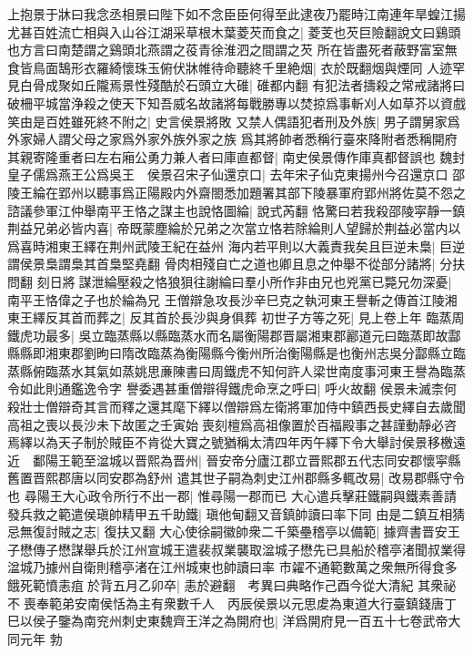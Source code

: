 上抱景于牀曰我念丞相景曰陛下如不念臣臣何得至此逮夜乃罷時江南連年旱蝗江揚尤甚百姓流亡相與入山谷江湖采草根木葉菱芡而食之|{
	菱芰也芡巨險翻說文曰鷄頭也方言曰南楚謂之鷄頭北燕謂之䓈青徐淮泗之間謂之芡}
所在皆盡死者蔽野富室無食皆鳥面鵠形衣羅綺懷珠玉俯伏牀帷待命聽終千里絶烟|{
	衣於既翻烟與煙同}
人迹罕見白骨成聚如丘隴焉景性殘酷於石頭立大碓|{
	碓都内翻}
有犯法者擣殺之常戒諸將曰破柵平城當浄殺之使天下知吾威名故諸將每戰勝專以焚掠爲事斬刈人如草芥以資戲笑由是百姓雖死終不附之|{
	史言侯景將敗}
又禁人偶語犯者刑及外族|{
	男子謂舅家爲外家婦人謂父母之家爲外家外族外家之族}
爲其將帥者悉稱行臺來降附者悉稱開府其親寄隆重者曰左右廂公勇力兼人者曰庫直都督|{
	南史侯景傳作庫真都督誤也}
魏封皇子儒爲燕王公爲吳王　侯景召宋子仙還京口|{
	去年宋子仙克東揚州今召還京口}
邵陵王綸在郢州以聽事爲正陽殿内外齋閤悉加題署其部下陵暴軍府郢州將佐莫不怨之諮議參軍江仲舉南平王恪之謀主也說恪圖綸|{
	說式芮翻}
恪驚曰若我殺邵陵寜靜一鎮荆益兄弟必皆内喜|{
	帝既蒙塵綸於兄弟之次當立恪若除綸則人望歸於荆益必當内以爲喜時湘東王繹在荆州武陵王紀在益州}
海内若平則以大義責我矣且巨逆未梟|{
	巨逆謂侯景梟謂梟其首梟堅堯翻}
骨肉相殘自亡之道也卿且息之仲舉不從部分諸將|{
	分扶問翻}
刻日將謀泄綸壓殺之恪狼狽往謝綸曰羣小所作非由兄也兇黨已斃兄勿深憂|{
	南平王恪偉之子也於綸為兄}
王僧辯急攻長沙辛巳克之執河東王譽斬之傳首江陵湘東王繹反其首而葬之|{
	反其首於長沙與身俱葬}
初世子方等之死|{
	見上卷上年}
臨蒸周鐵虎功最多|{
	吳立臨蒸縣以縣臨蒸水而名屬衡陽郡晋屬湘東郡酈道元曰臨蒸即故酃縣縣即湘東郡劉昫曰隋改臨蒸為衡陽縣今衡州所治衡陽縣是也衡州志吳分酃縣立臨蒸縣俯臨蒸水其氣如蒸姚思亷陳書曰周鐵虎不知何許人梁世南度事河東王譽為臨蒸令如此則通鑑逸令字}
譽委遇甚重僧辯得鐵虎命烹之呼曰|{
	呼火故翻}
侯景未滅柰何殺壯士僧辯奇其言而釋之還其麾下繹以僧辯爲左衛將軍加侍中鎮西長史繹自去歲聞高祖之喪以長沙未下故匿之壬寅始喪刻檀爲高祖像置於百福殿事之甚謹動靜必咨焉繹以為天子制於賊臣不肯從大寶之號猶稱太清四年丙午繹下令大舉討侯景移檄遠近　鄱陽王範至湓城以晋熙為晋州|{
	晉安帝分廬江郡立晋熙郡五代志同安郡懷寜縣舊置晋熙郡唐以同安郡為舒州}
遣其世子嗣為刺史江州郡縣多輒改易|{
	改易郡縣守令也}
尋陽王大心政令所行不出一郡|{
	惟尋陽一郡而已}
大心遣兵擊莊鐵嗣與鐵素善請發兵救之範遣侯瑱帥精甲五千助鐵|{
	瑱他甸翻又音鎮帥讀曰率下同}
由是二鎮互相猜忌無復討賊之志|{
	復扶又翻}
大心使徐嗣徽帥衆二千築壘稽亭以備範|{
	據齊書晋安王子懋傳子懋謀舉兵於江州宣城王遣裴叔業襲取湓城子懋先已具船於稽亭渚聞叔業得湓城乃據州自衛則稽亭渚在江州城東也帥讀曰率}
市糴不通範數萬之衆無所得食多餓死範憤恚疽於背五月乙卯卒|{
	恚於避翻　考異曰典略作己酉今從大清紀}
其衆祕不喪奉範弟安南侯恬為主有衆數千人　丙辰侯景以元思䖍為東道大行臺鎮錢唐丁巳以侯子鑒為南兖州刺史東魏齊王洋之為開府也|{
	洋爲開府見一百五十七卷武帝大同元年}
勃

